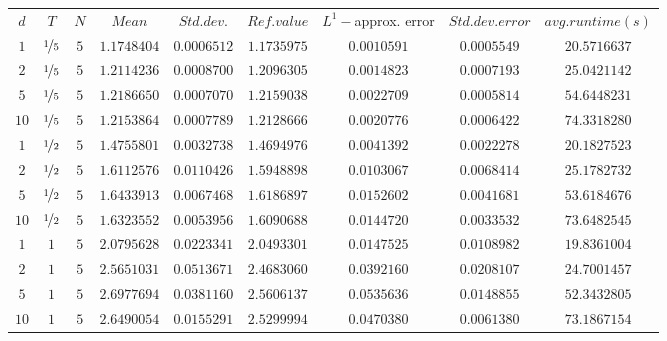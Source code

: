\begin{tabular}{ccccccccc}
$d$ & $T$ & $N$ & $Mean$ & $Std. dev.$ & $Ref. value$ & $L^1-$approx. error & $Std. dev. error$ & $avg. runtime (s)$\\
$1$ & $\nicefrac{1}{5}$ & $5$ & $1.1748404$ & $0.0006512$ & $1.1735975$ & $0.0010591$ & $0.0005549$ & $20.5716637$\\
$2$ & $\nicefrac{1}{5}$ & $5$ & $1.2114236$ & $0.0008700$ & $1.2096305$ & $0.0014823$ & $0.0007193$ & $25.0421142$\\
$5$ & $\nicefrac{1}{5}$ & $5$ & $1.2186650$ & $0.0007070$ & $1.2159038$ & $0.0022709$ & $0.0005814$ & $54.6448231$\\
$10$ & $\nicefrac{1}{5}$ & $5$ & $1.2153864$ & $0.0007789$ & $1.2128666$ & $0.0020776$ & $0.0006422$ & $74.3318280$\\
$1$ & $\nicefrac{1}{2}$ & $5$ & $1.4755801$ & $0.0032738$ & $1.4694976$ & $0.0041392$ & $0.0022278$ & $20.1827523$\\
$2$ & $\nicefrac{1}{2}$ & $5$ & $1.6112576$ & $0.0110426$ & $1.5948898$ & $0.0103067$ & $0.0068414$ & $25.1782732$\\
$5$ & $\nicefrac{1}{2}$ & $5$ & $1.6433913$ & $0.0067468$ & $1.6186897$ & $0.0152602$ & $0.0041681$ & $53.6184676$\\
$10$ & $\nicefrac{1}{2}$ & $5$ & $1.6323552$ & $0.0053956$ & $1.6090688$ & $0.0144720$ & $0.0033532$ & $73.6482545$\\
$1$ & $1$ & $5$ & $2.0795628$ & $0.0223341$ & $2.0493301$ & $0.0147525$ & $0.0108982$ & $19.8361004$\\
$2$ & $1$ & $5$ & $2.5651031$ & $0.0513671$ & $2.4683060$ & $0.0392160$ & $0.0208107$ & $24.7001457$\\
$5$ & $1$ & $5$ & $2.6977694$ & $0.0381160$ & $2.5606137$ & $0.0535636$ & $0.0148855$ & $52.3432805$\\
$10$ & $1$ & $5$ & $2.6490054$ & $0.0155291$ & $2.5299994$ & $0.0470380$ & $0.0061380$ & $73.1867154$\\
\end{tabular}
